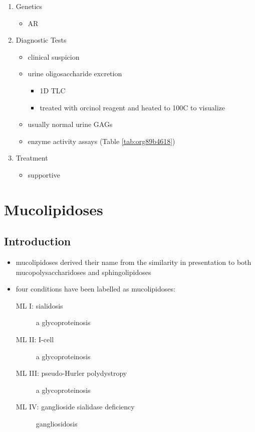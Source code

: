 \documentclass{scrartcl}
\begin{document}
\begin{enumerate}
\item Genetics
\label{sec:org723de53}
\begin{itemize}
\item AR
\end{itemize}
\item Diagnostic Tests
\label{sec:orgfcd5719}
\begin{itemize}
\item clinical suspicion
\item urine oligosaccharide excretion
\begin{itemize}
\item 1D TLC
\item treated with orcinol reagent and heated to 100C to visualize
\end{itemize}
\item usually normal urine GAGs
\item enzyme activity assays (Table \ref{tab:org89b4618})
\end{itemize}

\item Treatment
\label{sec:orgfd540d6}
\begin{itemize}
\item supportive
\end{itemize}
\end{enumerate}
\section{Mucolipidoses}
\label{sec:org31edbc2}
\subsection{Introduction}
\label{sec:org6d429e7}
\begin{itemize}
\item mucolipidoses derived their name from the similarity in
presentation to both mucopolysaccharidoses and sphingolipidoses
\item four conditions have been labelled as mucolipidoses:
\begin{description}
\item[{ML I: sialidosis}] a glycoproteinosis
\item[{ML II: I-cell}] a glycoproteinosis
\item[{ML III: pseudo-Hurler polydystropy}] a glycoproteinosis
\item[{ML IV: ganglioside sialidase deficiency}] gangliosidosis
\end{description}
\end{itemize}
\end{document}
